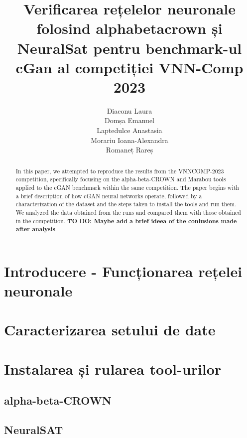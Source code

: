\documentclass[12pt,a4paper]{report}
\title{Verificarea rețelelor neuronale folosind alpha\textunderscore beta\textunderscore crown și NeuralSat pentru benchmark-ul cGan al competiției VNN-Comp 2023}
\author{ Diaconu Laura\\ Domșa Emanuel\\Laptedulce Anastasia \\ Morariu Ioana-Alexandra \\ Romaneț Rareș}
\date{}
\begin{document}
\maketitle


\begin{abstract}
In this paper, we attempted to reproduce the results from the VNNCOMP-2023 competition, specifically focusing on the alpha-beta-CROWN and Marabou tools applied to the cGAN benchmark within the same competition. The paper begins with a brief description of how cGAN neural networks operate, followed by a characterization of the dataset and the steps taken to install the tools and run them. We analyzed the data obtained from the runs and compared them with those obtained in the competition. \textbf{TO DO: Maybe add a brief ideea of the conlusions made after analysis}
\end{abstract}
\tableofcontents
\newpage

\section{Introducere - Funcționarea rețelei neuronale}




\section{Caracterizarea setului de date}




\section{Instalarea și rularea tool-urilor}

    \subsection{alpha-beta-CROWN}
    
    \subsection{NeuralSAT}
    
\end{document}
